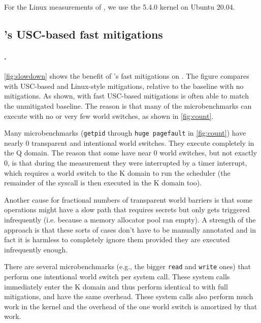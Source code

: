 For the Linux measurements of \bench, we use the 5.4.0 kernel on Ubuntu 20.04.


\subsection{\sys's USC-based fast mitigations}
\label{ss:faster}

\paragraph{\bench.}

\autoref{fig:slowdown} shows the benefit of \sys's fast mitigations on
\bench.  The figure compares \sys with USC-based and Linux-style mitigations,
relative to the baseline with no mitigations.
As shown, \sys with fast USC-based mitigations is often able to
match the unmitigated baseline.  The reason is that many of the microbenchmarks can
execute with no or very few world switches, as shown in
\autoref{fig:count}.

Many microbenchmarks (\texttt{getpid} through \texttt{huge pagefault}
in \autoref{fig:count}) have nearly 0 transparent and intentional
world switches. They execute completely in the Q domain. The
reason that some have near 0 world switches, but not exactly 0, is
that during the measurement they were interrupted by a timer
interrupt, which requires a world switch to the K domain to run the
scheduler (the remainder of the syscall is then executed in the K
domain too).

Another cause for fractional numbers of transparent world
barriers is that some operations might have a slow path that requires
secrets but only gets triggered infrequently (i.e. because a memory
allocator pool ran empty). A strength of the \sys approach is that these
sorts of cases don't have to be manually annotated and in fact it is
harmless to completely ignore them provided they are executed infrequently
enough.

There are several microbenchmarks (e.g., the bigger \texttt{read} and
\texttt{write} ones) that perform one intentional world switch per
system call.  These system calls immediately enter the K domain and
thus perform identical to \sys with full mitigations, and have the
same overhead.  These system calls also perform much work in the kernel and
the overhead of the one world switch is amortized by that work.

